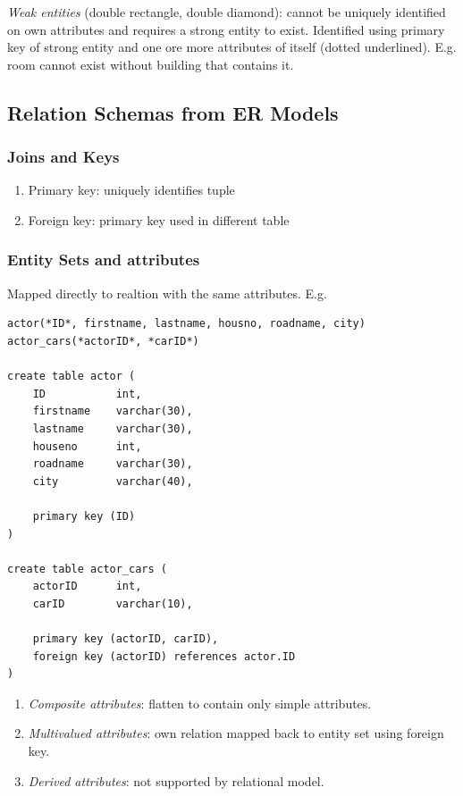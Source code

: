 \documentclass[twocolumn,english]{article}
\begin{document}
\emph{Weak entities} (double rectangle, double diamond): cannot be
uniquely identified on own attributes and requires a strong entity
to exist. Identified using primary key of strong entity and one ore
more attributes of itself (dotted underlined). E.g. room cannot exist
without building that contains it.


\subsection{Relation Schemas from ER Models}


\subsubsection{Joins and Keys}
\begin{enumerate}
\item Primary key: uniquely identifies tuple 
\item Foreign key: primary key used in different table 
\end{enumerate}

\subsubsection{Entity Sets and attributes}

Mapped directly to realtion with the same attributes. E.g.

\begin{lstlisting}
actor(*ID*, firstname, lastname, housno, roadname, city)
actor_cars(*actorID*, *carID*)

create table actor (
	ID           int,
	firstname    varchar(30),
	lastname     varchar(30),
	houseno      int,
	roadname     varchar(30),
	city         varchar(40),

	primary key (ID)
)

create table actor_cars (
	actorID      int,
	carID        varchar(10),
	
	primary key (actorID, carID),
	foreign key (actorID) references actor.ID
)
\end{lstlisting}

\begin{enumerate}
\item \emph{Composite attributes}: flatten to contain only simple attributes. 
\item \emph{Multivalued attributes}: own relation mapped back to entity
set using foreign key. 
\item \emph{Derived attributes}: not supported by relational model. 
\end{enumerate}
\end{document}
